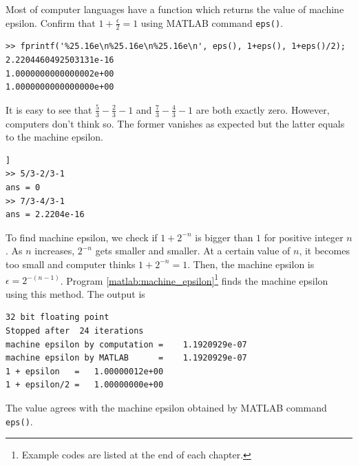 \bigskip
\begin{example}

Most of computer languages have a function which returns the value of machine epsilon.  
Confirm that $1+\frac{\epsilon}{2} = 1$ using MATLAB command \texttt{eps()}.

\small
\begin{mybox}
	\begin{verbatim}
>> fprintf('%25.16e\n%25.16e\n%25.16e\n', eps(), 1+eps(), 1+eps()/2);
2.2204460492503131e-16
1.0000000000000002e+00
1.0000000000000000e+00
   \end{verbatim}
\end{mybox}
\normalsize
\end{example}

\bigskip
\begin{example}
	
It is easy to see that  $\displaystyle\frac{5}{3}-\frac{2}{3}-1$ and $\displaystyle\frac{7}{3}-\frac{4}{3}-1$ are both exactly zero.  However, computers don't think so.  The former vanishes as expected but the latter equals to the machine epsilon.
\small
\begin{mybox}
	\begin{verbatim}]
>> 5/3-2/3-1
ans = 0
>> 7/3-4/3-1
ans = 2.2204e-16
   \end{verbatim}
\end{mybox}
\normalsize
\end{example}

	
\bigskip
\begin{example}
To find  machine epsilon, we check if $1+2^{-n}$ is bigger than $1$ for positive integer $n$.  As $n$ increases, $2^{-n}$ gets smaller and smaller.  At a certain value of $n$, it becomes too small and computer thinks $1+2^{-n} = 1$.  Then, the machine epsilon is $\epsilon = 2^{-(n-1)}$.  Program \ref{matlab:machine_epsilon}\footnote{Example codes are listed at the end of each chapter.} finds the machine epsilon using this method.  The output is 
\small
\begin{mybox}
	\begin{verbatim}
32 bit floating point
Stopped after  24 iterations 
machine epsilon by computation =    1.1920929e-07 
machine epsilon by MATLAB      =    1.1920929e-07 
1 + epsilon   =   1.00000012e+00 
1 + epsilon/2 =   1.00000000e+00 
   \end{verbatim}
\end{mybox}
\normalsize

\noindent
The value agrees with the machine epsilon obtained by MATLAB command \texttt{eps()}.
\end{example}

